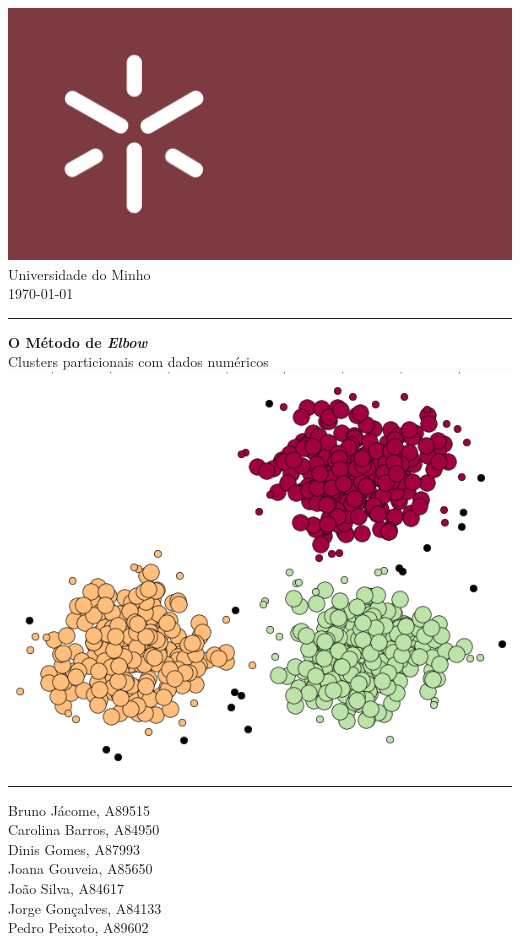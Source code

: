 \documentclass[12pt, a4paper, oneside]{scrreport}
\begin{document}
\normalfont

\clearpairofpagestyles




\begin{flushleft}
\includegraphics[scale = 0.075]{Minho_University.png}
 \large{\\Universidade do Minho\\\normalsize{\today}}
\end{flushleft}
\rule{\textwidth}{0.5pt}
\begin{flushright}
\Huge{\textbf{O Método de \textit{Elbow}}} \\ {\Large Clusters particionais com dados numéricos}
\includegraphics[scale = 0.55]{Cluster-Segmentation.png}
\end{flushright}

\begin{center}
\rule{\textwidth}{0.5pt}
\end{center}
\begin{multicols*}{2}
\noindent
\large Bruno Jácome, A89515\\
  Carolina Barros, A84950\\
  Dinis Gomes, A87993\\
  Joana Gouveia, A85650\columnbreak
  \\João Silva, A84617\\
  Jorge Gonçalves, A84133\\
  Pedro Peixoto, A89602
\end{multicols*}
\end{document}
